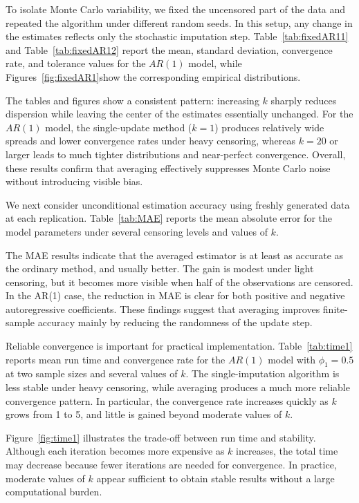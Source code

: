 \documentclass[twoside]{article}
\begin{document}
To isolate Monte Carlo variability, we fixed the uncensored part of the data and repeated the algorithm under different random seeds. In this setup, any change in the estimates reflects only the stochastic imputation step. Table~\ref{tab:fixedAR11} and Table~\ref{tab:fixedAR12} report the mean, standard deviation, convergence rate, and tolerance values for the $AR(1)$ model, while Figures~\ref{fig:fixedAR1}show the corresponding empirical distributions.
	
The tables and figures show a consistent pattern: increasing $k$ sharply reduces dispersion while leaving the center of the estimates essentially unchanged. For the $AR(1)$ model, the single-update method ($k=1$) produces relatively wide spreads and lower convergence rates under heavy censoring, whereas $k=20$ or larger leads to much tighter distributions and near-perfect convergence. Overall, these results confirm that averaging effectively suppresses Monte Carlo noise without introducing visible bias.
	
We next consider unconditional estimation accuracy using freshly generated data at each replication. Table~\ref{tab:MAE} reports the mean absolute error for the model parameters under several censoring levels and values of $k$.
	
The MAE results indicate that the averaged estimator is at least as accurate as the ordinary method, and usually better. The gain is modest under light censoring, but it becomes more visible when half of the observations are censored. In the AR(1) case, the reduction in MAE is clear for both positive and negative autoregressive coefficients. These findings suggest that averaging improves finite-sample accuracy mainly by reducing the randomness of the update step.
	
Reliable convergence is important for practical implementation. Table~\ref{tab:time1} reports mean run time and convergence rate for the $AR(1)$ model with $\phi_1=0.5$ at two sample sizes and several values of $k$. The single-imputation algorithm is less stable under heavy censoring, while averaging produces a much more reliable convergence pattern. In particular, the convergence rate increases quickly as $k$ grows from 1 to 5, and little is gained beyond moderate values of $k$.
	
Figure~\ref{fig:time1} illustrates the trade-off between run time and stability. Although each iteration becomes more expensive as $k$ increases, the total time may decrease because fewer iterations are needed for convergence. In practice, moderate values of $k$ appear sufficient to obtain stable results without a large computational burden.
	
\end{document}
